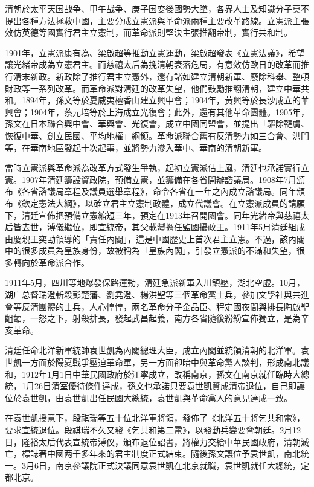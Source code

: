 清朝於太平天国战争、甲午战争、庚子国变後國勢大墜，各界人士及知識分子莫不提出各種方法拯救中國，主要分成立憲派與革命派兩種主要改革路線。立憲派主張效仿英德等國實行君主立憲制，而革命派則堅決主張推翻帝制，實行共和制。

1901年，立憲派康有為、梁啟超等推動立憲運動，梁啟超發表《立憲法議》，希望讓光緒帝成為立憲君主。而慈禧太后為挽清朝衰落危局，有意效仿歐日的改革而推行清末新政。新政除了推行君主立憲外，還有諸如建立清朝新軍、廢除科舉、整頓財政等一系列改革。而革命派對清廷的改革失望，他們鼓勵推翻清朝，建立中華共和。1894年，孫文等於夏威夷檀香山建立興中會；1904年，黃興等於長沙成立的華興會；1904年，蔡元培等於上海成立光復會；此外，還有其他革命團體。1905年，孫文在日本聯合興中會、華興會、光復會，成立中國同盟會，並提出「驅除韃虜、恢復中華、創立民國、平均地權」綱領。革命派聯合舊有反清勢力如三合會、洪門等，在華南地區發起十次起事，並將勢力滲入華中、華南的清朝新軍。

當時立憲派與革命派為改革方式發生爭執，起初立憲派佔上風，清廷也承諾實行立憲。1907年清廷籌設資政院，預備立憲，並籌備在各省開辦諮議局。1908年7月頒布《各省諮議局章程及議員選舉章程》，命令各省在一年之內成立諮議局。同年頒布《欽定憲法大綱》，以確立君主立憲制政體，成立代議會。在立憲派成員的請願下，清廷宣佈把預備立憲縮短三年，預定在1913年召開國會。同年光緒帝與慈禧太后皆去世，溥儀繼位，即宣統帝，其父載灃擔任監國攝政王。1911年5月清廷組成由慶親王奕劻領導的「責任內閣」，這是中國歷史上首次君主立憲。不過，該內閣中的很多成員為皇族身份，故被稱為「皇族內閣」，引發立憲派的不滿和失望，很多轉向於革命派合作。

1911年5月，四川等地爆發保路運動，清廷急派新軍入川鎮壓，湖北空虛。10月，湖广总督瑞澄斬殺彭楚藩、劉堯澄、楊洪聖等三個革命黨士兵，參加文學社與共進會等反清團體的士兵，人心惶惶，兩名革命分子金品臣、程定國夜間與排長陶啟聖齟齬，一怒之下，射殺排長，發起武昌起義，南方各省隨後紛紛宣佈獨立，是為辛亥革命。

清廷任命北洋新軍統帥袁世凱為內閣總理大臣，成立內閣並統領清朝的北洋軍。袁世凱一方面於陽夏戰爭壓迫革命軍，另一方面卻暗中與革命黨人談判，形成南北議和，1912年1月1日中華民國政府於江寧成立，改稱南京，孫文在南京就任臨時大總統，1月26日清室優待條件達成，孫文也承諾只要袁世凱贊成清帝退位，自己即讓位於袁世凱，由袁世凱出任民國大總統，袁世凱與革命黨人的意見達成一致。

在袁世凱授意下，段祺瑞等五十位北洋軍將領，發佈了《北洋五十將乞共和電》，要求宣統退位。段祺瑞不久又發《乞共和第二電》，以發動兵變要脅朝廷。2月12日，隆裕太后代表宣統帝溥仪，頒布退位詔書，將權力交給中華民國政府，清朝滅亡，標誌著中國两千多年來的君主制度正式結束。隨後孫文讓位予袁世凱，南北統一。3月6日，南京參議院正式決議同意袁世凱在北京就職，袁世凱就任大總統，定都北京。

